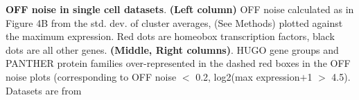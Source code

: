\textbf{OFF noise in single cell datasets}. \textbf{(Left column)} OFF noise calculated as in Figure 4B from the std. dev. of cluster averages, (See Methods) plotted against the maximum expression. Red dots are homeobox transcription factors, black dots are all other genes. \textbf{(Middle, Right columns)}. HUGO gene groups and PANTHER protein families over-represented in the dashed red boxes in the OFF noise plots (corresponding to OFF noise $<$ 0.2, log2(max expression$+$1 $>$ 4.5). Datasets are from \citep{Zeisel_2015,Tasic_2016,Zeisel_2018,Saunders_2018}